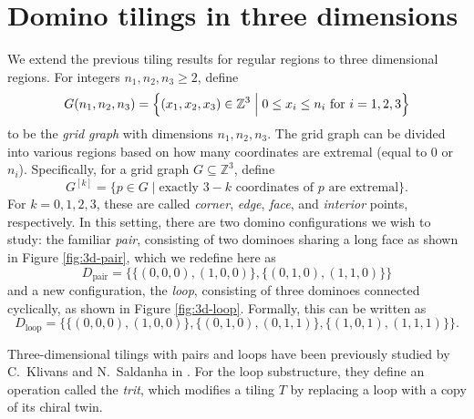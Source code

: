 \section{Domino tilings in three dimensions}\label{sec:three-dimensions}
We extend the previous tiling results for regular regions to three dimensional regions.
For integers $n_1, n_2, n_3 \geq 2$, define 
\begin{equation}
  G(n_1, n_2, n_3) = \Big\{(x_1, x_2, x_3) \in \mathbb{Z}^3 \Bigm| 0 \leq x_i \leq n_i \text{ for } i = 1,2,3 \Big\}
\end{equation}
to be the \emph{grid graph} with dimensions $n_1, n_2, n_3$. The grid graph can be divided into various regions based on how many coordinates are extremal (equal to $0$ or $n_i$). Specifically, for a grid graph $G \subseteq \mathbb{Z}^3$, define
\begin{equation}
  G^{[k]} = \Big\{p \in G \mid \text{exactly $3 - k$ coordinates of $p$ are extremal}\Big\}.
\end{equation}
For $k = 0, 1, 2, 3$, these are called \emph{corner}, \emph{edge}, \emph{face}, and \emph{interior} points, respectively.
In this setting, there are two domino configurations we wish to study: the familiar \emph{pair}, consisting of two dominoes sharing a long face as shown in Figure \ref{fig:3d-pair}, which we redefine here as
\begin{equation}
  D_{\mathrm{pair}} = \Big\{
      \big\{(0, 0, 0), (1, 0, 0)\big\}, 
      \big\{(0, 1, 0), (1, 1, 0)\big\}
  \Big\}
\end{equation}
and a new configuration, the \emph{loop}, consisting of three dominoes connected  cyclically, as shown in Figure \ref{fig:3d-loop}. Formally, this can be written as
\begin{equation}
  D_{\mathrm{loop}} = \Big\{
    \big\{(0, 0, 0), (1, 0, 0)\big\},
    \big\{(0, 1, 0), (0, 1, 1)\big\},
    \big\{(1, 0, 1), (1, 1, 1)\big\}
  \Big\}.
\end{equation}

Three-dimensional tilings with pairs and loops have been previously studied by C.~Klivans and N.~Saldanha in \cite{klivans2025}.
For the loop substructure, they define an operation called the \emph{trit}, which modifies a tiling $T$ by replacing a loop with a copy of its chiral twin. 

